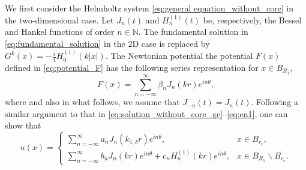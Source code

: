 \documentclass[11pt,reqno,twoside]{amsart}
\theoremstyle{definition}
\theoremstyle{remark}
\numberwithin{equation}{section}
\begin{document}
We first consider the Helmholtz system \eqref{eq:general equation_without_core} in the two-dimensional case. 
%
Let $J_n(t)$ and $H_n^{(1)}(t)$ be, respectively, the Bessel and Hankel functions of order $n\in\mathbb{N}$. The fundamental solution in \eqref{eq:fundamental_solution} in the 2D case is replaced by $G^{k}(x)=-\frac{i}{4} H_0^{(1)}(k|x|)$. The Newtonian potential  the potential $F(x)$ defined in \eqref{eq:potential_F} has the following series representation for $x\in B_{R_1}$,
\begin{equation}\label{eq:potential_F_expression_two}
 F(x)=\sum_{n=-\infty}^{\infty} \beta_n J_n(kr) e^{in\theta},
\end{equation}
where and also in what follows, we assume that $J_{-n}(t)=J_{n}(t)$. Following a similar argument to that in \eqref{eq:solution_without_core_ge}--\eqref{eq:en1}, one can show that 
\begin{equation}\label{eq:solution_without_core_ge_two}
  u(x)=\left\{
         \begin{array}{ll}
          {\sum_{n=-\infty}^{\infty} a_n J_n(k_{1,\delta}r) e^{in\theta}}, & x\in B_{r_e}, \\
          {\sum_{n=-\infty}^{\infty} b_n J_n(kr) e^{in\theta} + c_n H_n^{(1)}(kr) e^{in\theta}} , & x\in B_{R_1}\backslash \overline{B_{r_e}}.
         \end{array}
       \right.
\end{equation}
\end{document}
